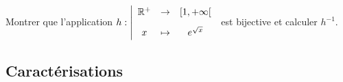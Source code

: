 \documentclass[a4paper, 11pt]{article}
\begin{document}
\begin{exemple}
	Montrer que l'application $h : \left| \begin{array}{ccc}
			\R^+ & \to     & [1,+\infty[\vsec \\
			x    & \mapsto & e^{\sqrt{x}}
		\end{array}\right.$ est bijective et calculer $h^{-1}$.

\end{exemple}



%
%
%
% 
%
%
% 
\subsection{Caract\'erisations}


\end{document}
